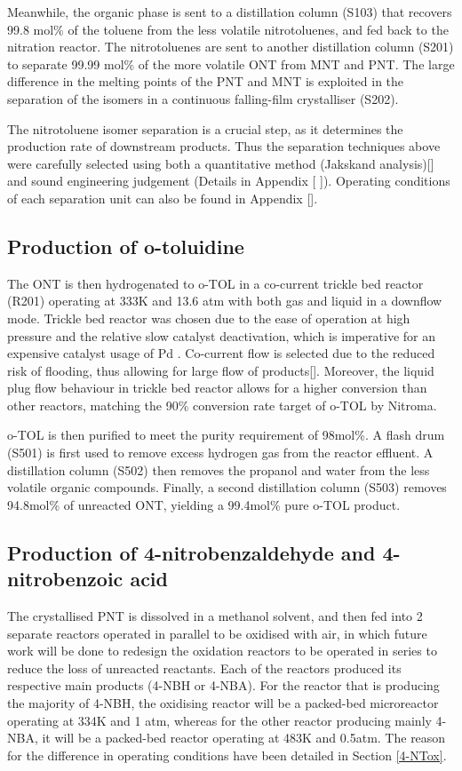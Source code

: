 Meanwhile, the organic phase is sent to a distillation column (S103) that recovers 99.8 mol\% of the toluene from the less volatile nitrotoluenes, and fed back to the nitration reactor. The nitrotoluenes are sent to another distillation column (S201) to separate 99.99 mol\% of the more volatile ONT from MNT and PNT. The large difference in the melting points of the PNT and MNT is exploited in the separation of the isomers in a continuous falling-film crystalliser (S202). 

The nitrotoluene isomer separation is a crucial step, as it determines the production rate of downstream products. Thus the separation techniques above were carefully selected using both a quantitative method (Jakskand analysis)[] and sound engineering judgement (Details in Appendix [ ]). Operating conditions of each separation unit can also be found in Appendix []. 

\subsection{Production of o-toluidine}
The ONT is then hydrogenated to o-TOL in a co-current trickle bed reactor (R201) operating at 333K and 13.6 atm with both gas and liquid in a downflow mode. Trickle bed reactor was chosen due to the ease of operation at high pressure and the relative slow catalyst deactivation, which is imperative for an expensive catalyst usage of Pd \cite{vemala_hydrodynamic_nodate}. Co-current flow is selected due to the reduced risk of flooding, thus allowing for large flow of products[]. Moreover, the liquid plug flow behaviour in trickle bed reactor allows for a higher conversion than other reactors, matching the 90\% conversion rate target of o-TOL by Nitroma. 

o-TOL is then purified to meet the purity requirement of 98mol\%. A flash drum (S501) is first used to remove excess hydrogen gas from the reactor effluent. A distillation column (S502) then removes the propanol and water from the less volatile organic compounds. Finally, a second distillation column (S503) removes 94.8mol\% of unreacted ONT, yielding a 99.4mol\% pure o-TOL product.
 
\subsection{Production of 4-nitrobenzaldehyde and 4-nitrobenzoic acid}
The crystallised PNT is dissolved in a methanol solvent, and then fed into 2 separate reactors operated in parallel to be oxidised with air, in which future work will be done to redesign the oxidation reactors to be operated in series to reduce the loss of unreacted reactants. Each of the reactors produced its respective main products (4-NBH or 4-NBA). For the reactor that is producing the majority of 4-NBH, the oxidising reactor will be a packed-bed microreactor operating at 334K and 1 atm, whereas for the other reactor producing mainly 4-NBA, it will be a packed-bed reactor operating at 483K and 0.5atm. The reason for the difference in operating conditions have been detailed in Section \ref{4-NTox}.

